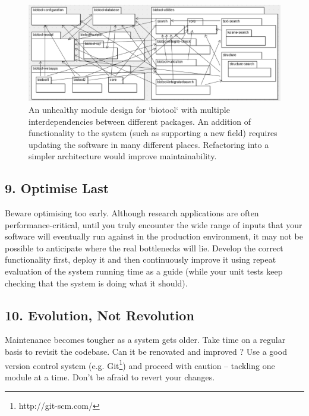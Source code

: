 \documentclass{bmcart}
\begin{document}
\begin{figure}%
\includegraphics[width=\columnwidth]{ComplexClassDiagram.png}%
\caption{An unhealthy module design for `biotool` with multiple interdependencies between different packages. An addition of functionality to the system (such as supporting a new field) requires updating the software in many different places. Refactoring into a simpler architecture would improve maintainability.}%
\label{fig-spaghetti}%
\end{figure}

\subsection*{9. Optimise Last}

Beware optimising too early. Although research applications are often performance-critical, until you truly encounter the wide range of inputs that your software will eventually run against in the production environment, it may not be possible to anticipate where the real bottlenecks will lie. Develop the correct functionality first, deploy it and then continuously improve it using repeat evaluation of the system running time as a guide (while your unit tests keep checking that the system is doing what it should). 

\subsection*{10. Evolution, Not Revolution}

Maintenance becomes tougher as a system gets older. Take time on a regular basis to revisit the codebase. Can it be renovated and improved \cite{refactoring}? Use a good version control system (e.g. Git\footnote{http://git-scm.com/}) and proceed with caution -- tackling one module at a time. Don't be afraid to revert your changes. 
\end{document}
